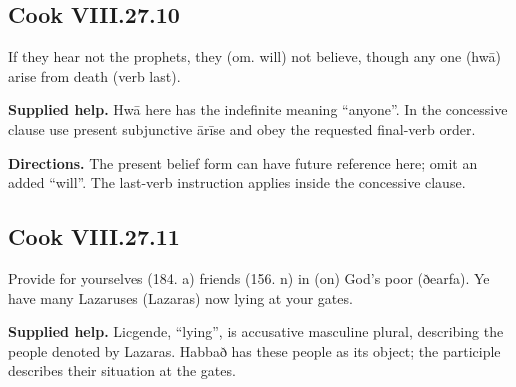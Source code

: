 \par\begin{minipage}{\linewidth}\raggedright
\subsection*{Cook VIII.27.10}

If they hear not the prophets, they (om. will) not believe, though any one (hwā) arise from death (verb last).

\end{minipage}\par\addvspace{4pt}

\textbf{Supplied help.} Hwā here has the indefinite meaning “anyone”. In the concessive clause use present subjunctive ārīse and obey the requested final-verb order.

\textbf{Directions.} The present belief form can have future reference here; omit an added “will”. The last-verb instruction applies inside the concessive clause.

\par\begin{minipage}{\linewidth}\raggedright
\subsection*{Cook VIII.27.11}

Provide for yourselves (184. a) friends (156. n) in (on) God’s poor (ðearfa). Ye have many Lazaruses (Lazaras) now lying at your gates.

\end{minipage}\par\addvspace{4pt}

\textbf{Supplied help.} Licgende, “lying”, is accusative masculine plural, describing the people denoted by Lazaras. Habbað has these people as its object; the participle describes their situation at the gates.

